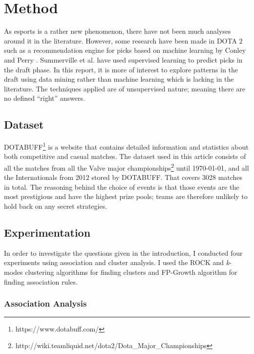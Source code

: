 \documentclass[report.tex]{subfiles}
\begin{document}
\section*{\centering Method}

As esports is a rather new phenomenon, there have not been much analyses around it in the literature. However, some research have been made in DOTA 2 such as a recommendation engine for picks based on machine learning by Conley and Perry \cite{conley2013does}. Summerville et al. \cite{cook2016draft} have used supervised learning to predict picks in the draft phase. In this report, it is more of interest to explore patterns in the draft using data mining rather than machine learning which is lacking in the literature. The techniques applied are of unsupervised nature; meaning there are no defined \enquote{right} answers.

\subsection*{Dataset}

DOTABUFF\footnote{https://www.dotabuff.com/} is a website that contains detailed information and statistics about both competitive and casual matches. The dataset used in this article consists of all the matches from all the Valve major championships\footnote{http://wiki.teamliquid.net/dota2/Dota\_Major\_Championships} until \today, and all the Internationals from 2012 stored by DOTABUFF. That covers 3028 matches in total. The reasoning behind the choice of events is that those events are the most prestigious and have the highest prize pools; teams are therefore unlikely to hold back on any secret strategies.

\subsection*{Experimentation}

In order to investigate the questions given in the introduction, I conducted four experiments using association and cluster analysis. I used the ROCK \cite{guha2000rock} and \textit{k}-modes clustering algorithms for finding clusters and FP-Growth algorithm \cite{han2000mining} for finding association rules.

\subsubsection*{Association Analysis}
\end{document}
